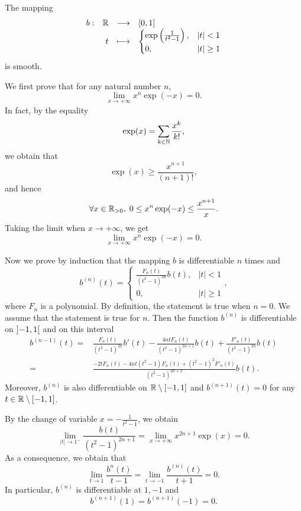 \begin{lemmaenv}
    The mapping
    $$\begin{array}{rrcl}
        b : & \mathbb{R} & \longrightarrow & [0,1]\\
        & t & \longmapsto & \begin{cases}
            \exp\left(\frac{1}{t^2 - 1}\right), & |t| < 1\\
            0, & |t|\ge 1
        \end{cases}
    \end{array}$$
    is smooth.
\end{lemmaenv}
\begin{proofenv}
    We first prove that for any natural number $n$,
    $$\lim_{x \to +\infty} x^n \exp(-x) = 0.$$
    In fact, by the equality
    $$\exp(x) = \sum_{k \in \mathbb{N}} \frac{x^k}{k!},$$
    we obtain that
    $$\exp(x) \ge \frac{x^{n+1}}{(n+1)!},$$
    and hence
    $$\forall x \in \mathbb{R}_{>0},\; 0 \le x^n \exp(-x) \le \frac{x^{n+1}}{x}.$$
    Taking the limit when $x \rightarrow +\infty$, we get
    $$\lim_{x \to +\infty} x^n \exp(-x) = 0.$$
    
    \quad Now we prove by induction that the mapping $b$ is differentiable $n$ times and 
    $$b^{(n)}(t) = \begin{cases}
        \frac{F_n(t)}{(t^2 - 1)^{2n}} b(t), & |t| < 1\\
        0, & |t|\ge 1
    \end{cases},$$
    where $F_n$ is a polynomial.
    By definition, the statement is true when $n = 0$.
    We assume that the statement is true for $n$.
    Then the function $b^{(n)}$ is differentiable on $\interval[open]{-1}{1}$ and on this interval
    $$\begin{aligned}
        b^{(n-1)}(t) = & \frac{F_{n}(t)}{(t^2 - 1)^{2n}}b'(t) - \frac{4ntF_n(t)}{(t^2 - 1)^{2n+1}}b(t) + \frac{F'_n(t)}{(t^2 - 1)^{2n}} b(t)\\
        = & \frac{-2t F_n(t) - 4nt (t^2 - 1) F_n(t) +(t^2 - 1)^2 F'_n(t)}{(t^2 - 1)^{2n+2}} b(t).
    \end{aligned}$$
    Moreover, $b^{(n)}$ is also differentiable on $\RR\setminus\interval{-1}{1}$ and $b^{(n+1)}(t) = 0$ for any $t \in \mathbb{R}\setminus[-1,1]$.

    \quad By the change of variable $x = - \frac{1}{t^2 - 1}$, we obtain
    $$\lim_{|t| \to 1^-} \frac{b(t)}{(t^2 - 1)^{2n + 1}} = \lim_{x \rightarrow +\infty} x^{2n + 1} \exp(x) = 0.$$
    As a consequence, we obtain that
    $$\lim_{t \rightarrow 1} \frac{b^{n}(t)}{t - 1} = \lim_{t \rightarrow -1} \frac{b^{(n)}(t)}{t + 1} = 0.$$
    In particular, $b^{(n)}$ is differentiable at $1,-1$ and 
    $$b^{(n+1)}(1) = b^{(n+1)}(-1) = 0.$$
\end{proofenv}

